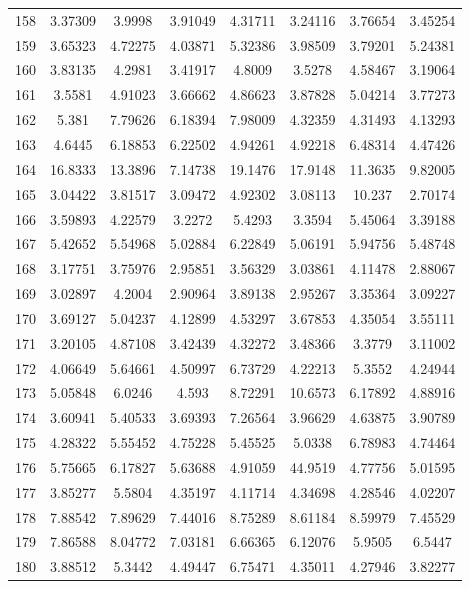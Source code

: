 \begin{figure}
\begin{tabular}{cccccccc}
158 & 3.37309 & 3.9998 & 3.91049 & 4.31711 & 3.24116 & 3.76654 & 3.45254\\
159 & 3.65323 & 4.72275 & 4.03871 & 5.32386 & 3.98509 & 3.79201 & 5.24381\\
160 & 3.83135 & 4.2981 & 3.41917 & 4.8009 & 3.5278 & 4.58467 & 3.19064\\
161 & 3.5581 & 4.91023 & 3.66662 & 4.86623 & 3.87828 & 5.04214 & 3.77273\\
162 & 5.381 & 7.79626 & 6.18394 & 7.98009 & 4.32359 & 4.31493 & 4.13293\\
163 & 4.6445 & 6.18853 & 6.22502 & 4.94261 & 4.92218 & 6.48314 & 4.47426\\
164 & 16.8333 & 13.3896 & 7.14738 & 19.1476 & 17.9148 & 11.3635 & 9.82005\\
165 & 3.04422 & 3.81517 & 3.09472 & 4.92302 & 3.08113 & 10.237 & 2.70174\\
166 & 3.59893 & 4.22579 & 3.2272 & 5.4293 & 3.3594 & 5.45064 & 3.39188\\
167 & 5.42652 & 5.54968 & 5.02884 & 6.22849 & 5.06191 & 5.94756 & 5.48748\\
168 & 3.17751 & 3.75976 & 2.95851 & 3.56329 & 3.03861 & 4.11478 & 2.88067\\
169 & 3.02897 & 4.2004 & 2.90964 & 3.89138 & 2.95267 & 3.35364 & 3.09227\\
170 & 3.69127 & 5.04237 & 4.12899 & 4.53297 & 3.67853 & 4.35054 & 3.55111\\
171 & 3.20105 & 4.87108 & 3.42439 & 4.32272 & 3.48366 & 3.3779 & 3.11002\\
172 & 4.06649 & 5.64661 & 4.50997 & 6.73729 & 4.22213 & 5.3552 & 4.24944\\
173 & 5.05848 & 6.0246 & 4.593 & 8.72291 & 10.6573 & 6.17892 & 4.88916\\
174 & 3.60941 & 5.40533 & 3.69393 & 7.26564 & 3.96629 & 4.63875 & 3.90789\\
175 & 4.28322 & 5.55452 & 4.75228 & 5.45525 & 5.0338 & 6.78983 & 4.74464\\
176 & 5.75665 & 6.17827 & 5.63688 & 4.91059 & 44.9519 & 4.77756 & 5.01595\\
177 & 3.85277 & 5.5804 & 4.35197 & 4.11714 & 4.34698 & 4.28546 & 4.02207\\
178 & 7.88542 & 7.89629 & 7.44016 & 8.75289 & 8.61184 & 8.59979 & 7.45529\\
179 & 7.86588 & 8.04772 & 7.03181 & 6.66365 & 6.12076 & 5.9505 & 6.5447\\
180 & 3.88512 & 5.3442 & 4.49447 & 6.75471 & 4.35011 & 4.27946 & 3.82277\\

\end{tabular}
\end{figure}
